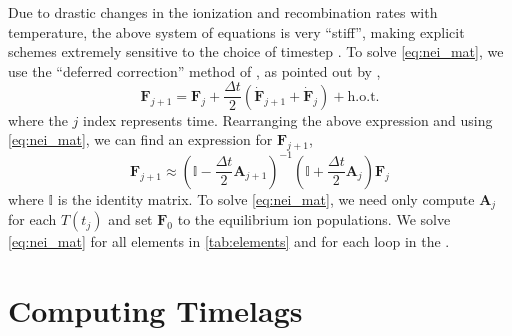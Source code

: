 Due to drastic changes in the ionization and recombination rates with temperature, the above system of equations is very ``stiff'', making explicit schemes extremely sensitive to the choice of timestep \citep{macneice_numerical_1984,bradshaw_numerical_2009}. To solve \autoref{eq:nei_mat}, we use the ``deferred correction'' method of \citet{npl_modern_1961}, as pointed out by \citet{macneice_numerical_1984},
\begin{equation}
    \mathbf{F}_{j+1} = \mathbf{F}_j + \frac{\Delta t}{2}(\dot{\mathbf{F}}_{j+1} + \dot{\mathbf{F}}_j) + \mathrm{h.o.t.}
\end{equation}
where the $j$ index represents time. Rearranging the above expression and using \autoref{eq:nei_mat}, we can find an expression for $\mathbf{F}_{j+1}$,
\begin{equation}
    \mathbf{F}_{j+1} \approx \left(\mathbb{I} - \frac{\Delta t}{2}\mathbf{A}_{j+1}\right)^{-1}\left(\mathbb{I} + \frac{\Delta t}{2}\mathbf{A}_{j}\right)\mathbf{F}_j
\end{equation}
where $\mathbb{I}$ is the identity matrix. To solve \autoref{eq:nei_mat}, we need only compute $\mathbf{A}_j$ for each $T(t_j)$ and set $\mathbf{F}_0$ to the equilibrium ion populations. We solve \autoref{eq:nei_mat} for all elements in \autoref{tab:elements} and for each loop in the \AR{}.


\section{Computing Timelags}\label{timelags}

